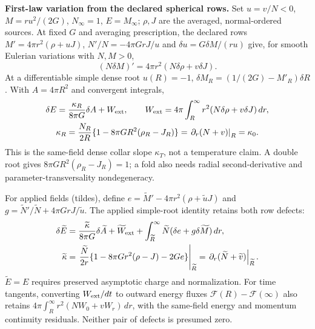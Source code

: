 \documentclass[10pt]{article}
\begin{document}
\setlength{\abovedisplayskip}{4pt}
\setlength{\belowdisplayskip}{4pt}
\noindent\textbf{First-law variation from the declared spherical rows.}
Set $u=v/N<0$, $M=ru^2/(2G)$, $N_\infty=1$, $E=M_\infty$;
$\rho,J$ are the averaged, normal-ordered sources. At fixed $G$ and
averaging prescription, the declared rows
$M'=4\pi r^2(\rho+uJ)$, $N'/N=-4\pi GrJ/u$ and
$\delta u=G\delta M/(ru)$ give, for smooth Eulerian variations with $N,M>0$,
\[
 (N\delta M)'=4\pi r^2(N\delta\rho+v\delta J).
\]
At a differentiable simple dense root $u(R)=-1$,
$\delta M_R=(1/(2G)-M'_R)\delta R$. With $A=4\pi R^2$ and convergent integrals,
\begin{gather*}
 \delta E=\frac{\kappa_R}{8\pi G}\delta A+W_{\rm ext},\qquad
 W_{\rm ext}=4\pi\int_R^\infty r^2(N\delta\rho+v\delta J)\,dr,\\
 \kappa_R=\frac{N_R}{2R}\{1-8\pi GR^2(\rho_R-J_R)\}
          =\left.\partial_r(N+v)\right|_R=\kappa_0.
\end{gather*}
This is the same-field dense collar slope $\kappa_T$, not a temperature
claim. A double root gives $8\pi G R^2(\rho_R-J_R)=1$; a fold also needs
radial second-derivative and parameter-transversality nondegeneracy.

For applied fields (tildes), define
$e=\widetilde M'-4\pi r^2(\rho+\widetilde uJ)$ and
$g=\widetilde N'/\widetilde N+4\pi GrJ/\widetilde u$.
The applied simple-root identity retains both row defects:
\begin{align*}
 \delta\widetilde E
 &=\frac{\widetilde\kappa}{8\pi G}\delta\widetilde A
   +\widetilde W_{\rm ext}
   +\int_{\widetilde R}^{\infty}\widetilde N
                    (\delta e+g\delta\widetilde M)\,dr,\\
 \widetilde\kappa
 &=\left.\frac{\widetilde N}{2r}
       \{1-8\pi Gr^2(\rho-J)-2Ge\}\right|_{\widetilde R}
   =\left.\partial_r(\widetilde N+\widetilde v)\right|_{\widetilde R}.
\end{align*}
$\widetilde E=E$ requires preserved asymptotic charge and normalization.
For time tangents, converting $W_{\rm ext}/dt$ to outward energy fluxes
$\mathcal F(R)-\mathcal F(\infty)$ also retains
$4\pi\int_R^\infty r^2(NW_0+vW_r)\,dr$, with the same-field energy
and momentum continuity residuals. Neither pair of defects is presumed zero.
\end{document}
